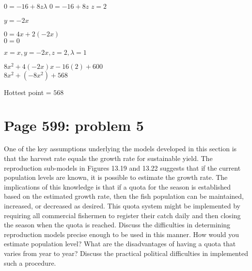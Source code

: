 \documentclass[]{article}
\begin{document}
\(0 = -16 + 8z \lambda\) \(0 = -16 + 8z\) \(z = 2\)

\(y = -2x\)

\(0 = 4x + 2(-2x)\)\\
\(0 = 0\)

\(x = x, y = -2x, z = 2, \lambda = 1\)

\(8x^2 + 4(-2x)x - 16(2) + 600\)\\
\(8x^2 + (-8x^2) + 568\)

Hottest point = \(568\)

\section{Page 599: problem 5}\label{page-599-problem-5}

One of the key assumptions underlying the models developed in this
section is that the harvest rate equals the growth rate for sustainable
yield. The reproduction sub-models in Figures 13.19 and 13.22 suggests
that if the current population levels are known, it is possible to
estimate the growth rate. The implications of this knowledge is that if
a quota for the season is established based on the estimated growth
rate, then the fish population can be maintained, increased, or
decreased as desired. This quota system might be implemented by
requiring all commercial fishermen to register their catch daily and
then closing the season when the quota is reached. Discuss the
difficulties in determining reproduction models precise enough to be
used in this manner. How would you estimate population level? What are
the disadvantages of having a quota that varies from year to year?
Discuss the practical political difficulties in implemented such a
procedure.
\end{document}
